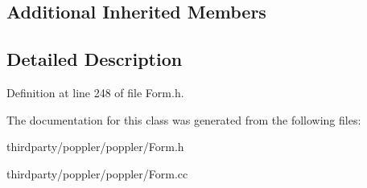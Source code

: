 \subsection*{Additional Inherited Members}


\subsection{Detailed Description}


Definition at line 248 of file Form.\+h.



The documentation for this class was generated from the following files\+:\begin{DoxyCompactItemize}
\item 
thirdparty/poppler/poppler/Form.\+h\item 
thirdparty/poppler/poppler/Form.\+cc\end{DoxyCompactItemize}

